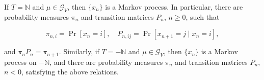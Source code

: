 If $T = \mathbb{N}$ and $\mu \in \mathcal{G}_V$, then $\{x_n\}$ is a Markov process. In particular, there are probability measures $\pi_n$ and transition matrices $P_n$, $n \geq 0$, such that

$$\pi_{n,i} = \Pr[x_n = i], \quad P_{n,ij} = \Pr[x_{n+1} = j \mid x_n = i],$$

and $\pi_n P_n = \pi_{n+1}$. Similarly, if $T = -\mathbb{N}$ and $\mu \in \mathcal{G}_V$, then $\{x_n\}$ is a Markov process on $-\mathbb{N}$, and there are probability measures $\pi_n$ and transition matrices $P_n$, $n < 0$, satisfying the above relations.
